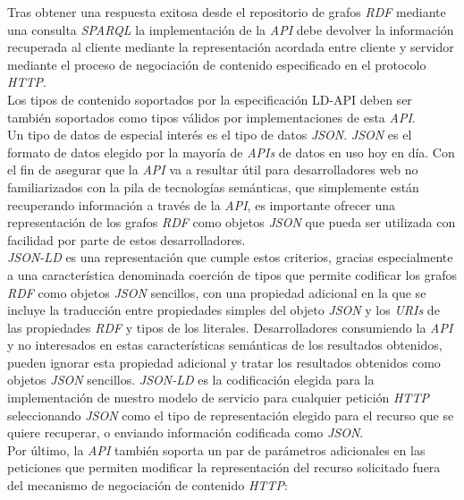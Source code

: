 Tras obtener una respuesta exitosa desde el repositorio de grafos \textit{RDF} mediante una consulta \textit{SPARQL} la implementaci\'on de la \textit{API} debe devolver la informaci\'on recuperada al cliente mediante la representaci\'on acordada entre cliente y servidor mediante el proceso de negociaci\'on de contenido especificado en el protocolo \textit{HTTP}.\\
Los tipos de contenido soportados por la especificaci\'on LD-API deben ser tambi\'en soportados como tipos v\'alidos por implementaciones de esta \textit{API}.\\
Un tipo de datos de especial inter\'es es el tipo de datos \textit{JSON}. \textit{JSON} es el formato de datos elegido por la mayor\'ia de \textit{APIs} de datos en uso hoy en d\'ia. Con el fin de asegurar que la \textit{API} va a resultar \'util para desarrolladores web no familiarizados con la pila de tecnolog\'ias sem\'anticas, que simplemente est\'an recuperando informaci\'on a trav\'es de la \textit{API}, es importante ofrecer una representaci\'on de los grafos \textit{RDF} como objetos \textit{JSON} que pueda ser utilizada con facilidad por parte de estos desarrolladores.\\
\textit{JSON-LD} \cite{jsonld} es una representaci\'on que cumple estos criterios, gracias especialmente a una caracter\'istica denominada coerci\'on de tipos que permite codificar los grafos \textit{RDF} como objetos \textit{JSON} sencillos, con una propiedad adicional en la que se incluye la traducci\'on entre propiedades simples del objeto \textit{JSON} y los \textit{URIs} de las propiedades \textit{RDF} y tipos de los literales. Desarrolladores consumiendo la \textit{API} y no interesados en estas caracter\'isticas sem\'anticas de los resultados obtenidos, pueden ignorar esta propiedad adicional y tratar los resultados obtenidos como objetos \textit{JSON} sencillos. \textit{JSON-LD} es la codificaci\'on elegida para la implementaci\'on de nuestro modelo de servicio para cualquier petici\'on \textit{HTTP} seleccionando \textit{JSON} como el tipo de representaci\'on elegido para el recurso que se quiere recuperar, o enviando informaci\'on codificada como \textit{JSON}.\\
Por \'ultimo, la \textit{API} tambi\'en soporta un par de par\'ametros adicionales en las peticiones que permiten modificar la representaci\'on del recurso solicitado fuera del mecanismo de negociaci\'on de contenido \textit{HTTP}:

